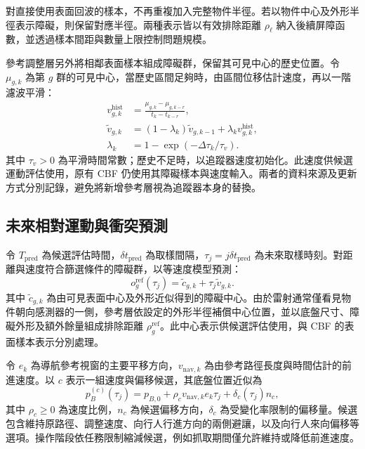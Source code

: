 對直接使用表面回波的樣本，不再重複加入完整物件半徑。若以物件中心及外形半徑表示障礙，則保留對應半徑。兩種表示皆以有效排除距離 $\rho_{\ell}$ 納入後續屏障函數，並透過樣本間距與數量上限控制問題規模。

參考調整層另外將相鄰表面樣本組成障礙群，保留其可見中心的歷史位置。令 $\mu_{g,k}$ 為第 $g$ 群的可見中心，當歷史區間足夠時，由區間位移估計速度，再以一階濾波平滑：
\begin{equation}
    \begin{aligned}
        v_{g,k}^{\mathrm{hist}}
        &=\frac{\mu_{g,k}-\mu_{g,k-r}}{t_k-t_{k-r}},\\
        \tilde v_{g,k}
        &=(1-\lambda_k)\tilde v_{g,k-1}
          +\lambda_k v_{g,k}^{\mathrm{hist}},\\
        \lambda_k&=1-\exp(-\Delta\tau_k/\tau_v).
    \end{aligned}
    \label{eq:ch3_reference_obstacle_velocity}
\end{equation}
其中 $\tau_v>0$ 為平滑時間常數；歷史不足時，以追蹤器速度初始化。此速度供候選運動評估使用，原有 CBF 仍使用其障礙樣本與速度輸入。兩者的資料來源及更新方式分別記錄，避免將新增參考層視為追蹤器本身的替換。


\subsection{未來相對運動與衝突預測}
\label{subsec:future_motion_conflict}

令 $T_{\mathrm{pred}}$ 為候選評估時間，$\delta t_{\mathrm{pred}}$ 為取樣間隔，$\tau_j=j\delta t_{\mathrm{pred}}$ 為未來取樣時刻。對距離與速度符合篩選條件的障礙群，以等速度模型預測：
\begin{equation}
    o_g^{\mathrm{ref}}(\tau_j)
    =\tilde c_{g,k}+\tau_j\tilde v_{g,k}.
    \label{eq:ch3_reference_obstacle_prediction}
\end{equation}
其中 $\tilde c_{g,k}$ 為由可見表面中心及外形近似得到的障礙中心。由於雷射通常僅看見物件朝向感測器的一側，參考層依設定的外形半徑補償中心位置，並以底盤尺寸、障礙外形及額外餘量組成排除距離 $\rho_g^{\mathrm{ref}}$。此中心表示供候選評估使用，與 CBF 的表面樣本表示分別處理。

令 $e_k$ 為導航參考視窗的主要平移方向，$v_{\mathrm{nav},k}$ 為由參考路徑長度與時間估計的前進速度。以 $c$ 表示一組速度與偏移候選，其底盤位置近似為
\begin{equation}
    p_B^{(c)}(\tau_j)
    =p_{B,0}+\rho_c v_{\mathrm{nav},k}e_k\tau_j
      +\delta_c(\tau_j)n_c,
    \label{eq:ch3_candidate_base_motion}
\end{equation}
其中 $\rho_c\geq0$ 為速度比例，$n_c$ 為候選偏移方向，$\delta_c$ 為受變化率限制的偏移量。候選包含維持原路徑、調整速度、向行人行進方向的兩側避讓，以及向行人來向偏移等選項。操作階段依任務限制縮減候選，例如抓取期間僅允許維持或降低前進速度。


